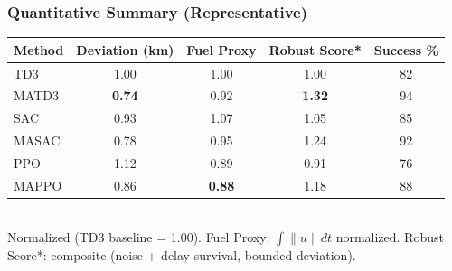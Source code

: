 
\begin{frame}
  \frametitle{Quantitative Summary (Representative)}
  \small
  \begin{tabular}{|l|c|c|c|c|}
    \hline
    Method & Deviation (km) & Fuel Proxy & Robust Score* & Success \% \\
    \hline
    TD3 & 1.00 & 1.00 & 1.00 & 82 \\
    MATD3 & \textbf{0.74} & 0.92 & \textbf{1.32} & 94 \\
    SAC & 0.93 & 1.07 & 1.05 & 85 \\
    MASAC & 0.78 & 0.95 & 1.24 & 92 \\
    PPO & 1.12 & 0.89 & 0.91 & 76 \\
    MAPPO & 0.86 & \textbf{0.88} & 1.18 & 88 \\
    \hline
  \end{tabular}
  \vspace{4pt}\\
  \footnotesize
  Normalized (TD3 baseline = 1.00). Fuel Proxy: $\int \|u\| dt$ normalized. Robust Score*: composite (noise + delay survival, bounded deviation).
\end{frame}

